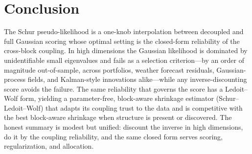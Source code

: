 \documentclass[11pt]{article}
\begin{document}
\section{Conclusion}
The Schur pseudo-likelihood is a one-knob interpolation between decoupled and full Gaussian scoring
whose optimal setting is the closed-form reliability of the cross-block coupling. In high dimensions the
Gaussian likelihood is dominated by unidentifiable small eigenvalues and fails as a selection
criterion---by an order of magnitude out-of-sample, across portfolios, weather forecast residuals,
Gaussian-process fields, and Kalman-style innovations alike---while any inverse-discounting score
avoids the failure. The same reliability that governs the score has a Ledoit--Wolf form, yielding a
parameter-free, block-aware shrinkage estimator (Schur--Ledoit--Wolf) that adapts its coupling trust to
the data and is competitive with the best block-aware shrinkage when structure is present or discovered.
The honest summary is modest but unified: discount the inverse in high dimensions, do it by the
coupling reliability, and the same closed form serves scoring, regularization, and allocation.



\end{document}
